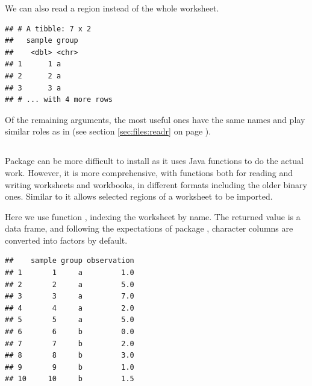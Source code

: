 \documentclass[krantz2]{krantz}\usepackage{knitr}
\begin{document}
We can also read a region instead of the whole worksheet.

\begin{knitrout}\footnotesize
{}\color{fgcolor}\begin{kframe}
\begin{alltt}
 \hlkwb{<-} \hlstd{(}\hlstd{,}  \hlstd{=} \hlstd{,}  \hlstd{=} \hlstd{)}
\end{alltt}
\begin{verbatim}
## # A tibble: 7 x 2
##   sample group
##    <dbl> <chr>
## 1      1 a    
## 2      2 a    
## 3      3 a    
## # ... with 4 more rows
\end{verbatim}
\end{kframe}
\end{knitrout}

Of the remaining arguments, the most useful ones have the same names and play similar roles as in  (see section \ref{sec:files:readr} on page \pageref{sec:files:readr}).

\subsection[`xlsx']{}



Package  can be more difficult to install as it uses Java functions to do the actual work. However, it is more comprehensive, with functions both for reading and writing  worksheets and workbooks, in different formats including the older binary ones. Similar to  it allows selected regions of a worksheet to be imported.

Here we use function , indexing the worksheet by name. The returned value is a data frame, and following the expectations of \Rlang package , character columns are converted into factors by default.

\begin{knitrout}\footnotesize
{}\color{fgcolor}\begin{kframe}
\begin{alltt}
 \hlkwb{<-} \hlstd{(}\hlstd{,}  \hlstd{=} \hlstd{)}
\end{alltt}
\begin{verbatim}
##    sample group observation
## 1       1     a         1.0
## 2       2     a         5.0
## 3       3     a         7.0
## 4       4     a         2.0
## 5       5     a         5.0
## 6       6     b         0.0
## 7       7     b         2.0
## 8       8     b         3.0
## 9       9     b         1.0
## 10     10     b         1.5
\end{verbatim}
\end{kframe}
\end{knitrout}
\end{document}
